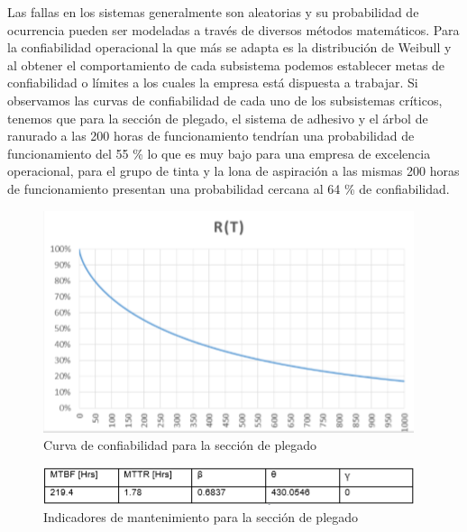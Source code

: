 \begin{description}
Las fallas en los sistemas generalmente son aleatorias y su probabilidad de ocurrencia pueden ser modeladas a través de diversos métodos matemáticos. Para la confiabilidad operacional la que más se adapta es la distribución de Weibull y al obtener el comportamiento de cada subsistema podemos establecer metas de confiabilidad o límites a los cuales la empresa está dispuesta a trabajar. Si observamos las curvas de confiabilidad de cada uno de los subsistemas críticos, tenemos que para la sección de plegado, el sistema de adhesivo y el árbol de ranurado a las 200 horas de funcionamiento tendrían una probabilidad de funcionamiento del 55 \% lo que es muy bajo para una empresa de excelencia operacional, para el grupo de tinta y la lona de aspiración a las mismas 200 horas de funcionamiento presentan una probabilidad cercana al 64 \% de confiabilidad.  

\begin{figure}[H]
\centering
\includegraphics[scale=0.8]{images/plegadoraconf.png}
\caption{Curva de confiabilidad para la sección de plegado \parencite{cruz2018}}
\end{figure}

\begin{figure}[H]
\centering
\includegraphics[scale=0.9]{images/plegadoraind.png}
\caption{Indicadores de mantenimiento para la sección de plegado \parencite{cruz2018}}
\end{figure}

\end{description}

